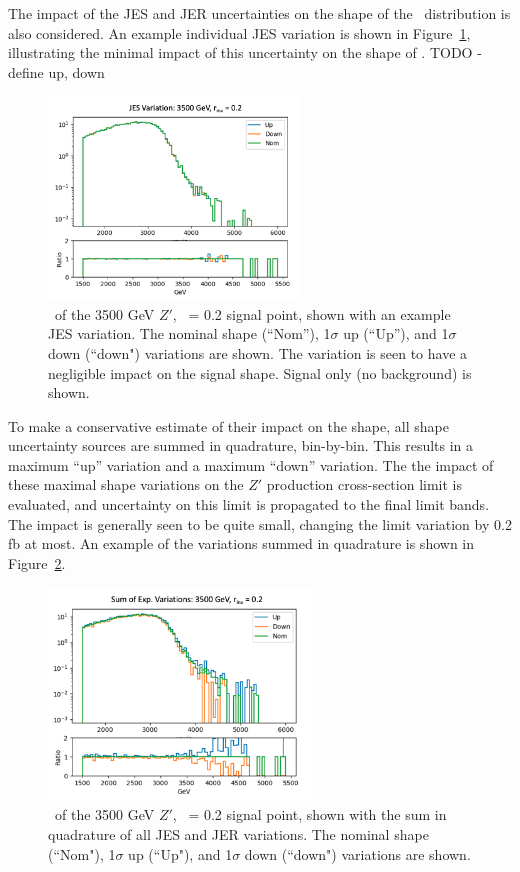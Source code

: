 The impact of the JES and JER uncertainties on the shape of the \mt~distribution is also considered.
An example individual JES variation is shown in Figure~\ref{fig:jes_uncert}, illustrating the minimal impact of this uncertainty on the shape of \mt.
TODO - define up, down
\begin{figure}[!htbp]
\centering
   \includegraphics[width=0.6\textwidth]{figures/results/jes}
    \caption{\mt~of the 3500 GeV $Z'$, \rinv~= 0.2 signal point, shown with an example JES variation. The nominal shape (``Nom''), 1$\sigma$ up (``Up''), and 1$\sigma$ down (``down") variations are shown. The variation is seen to have a negligible impact on the signal shape. Signal only (no background) is shown. 
    \label{fig:jes_uncert}}
\end{figure}

To make a conservative estimate of their impact on the shape, all shape uncertainty sources are summed in quadrature, bin-by-bin.
This results in a maximum ``up'' variation and a maximum ``down'' variation.
The the impact of these maximal shape variations on the $Z'$ production cross-section limit is evaluated, and uncertainty on this limit is propagated to the final limit bands. 
The impact is generally seen to be quite small, changing the limit variation by 0.2 fb at most. 
An example of the variations summed in quadrature is shown in Figure~\ref{fig:jetcp_sumq}. 
\begin{figure}[!htbp]
\centering
   \includegraphics[width=0.62\textwidth]{figures/results/jetcp_sumq}
    \caption{\mt~of the 3500 GeV $Z'$, \rinv~= 0.2 signal point, shown with the sum in quadrature of all JES and JER variations. The nominal shape (``Nom"), 1$\sigma$ up (``Up"), and 1$\sigma$ down (``down") variations are shown.
    \label{fig:jetcp_sumq}}
\end{figure}

